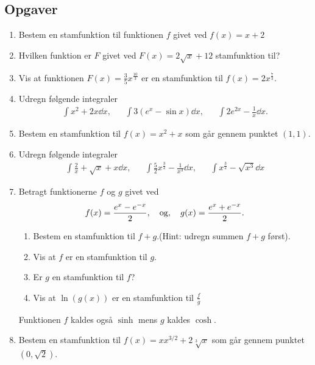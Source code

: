 \subsection{Opgaver}


\begin{enumerate}
	\item Bestem en stamfunktion til funktionen $f$ givet ved $f(x)=x+2$
	
	\item Hvilken funktion er $F$ givet ved $F(x)= 2\sqrt{x}+12$ stamfunktion til?
	
	\item Vis at funktionen $F(x)=\frac{3}{5}x^{\frac{10}{3}}$ er en stamfunktion til $f(x)=2x^{\frac{7}{3}}$.
	
	\item Udregn følgende integraler
	\begin{align*}
	\int x^2+2x\dd x,&& \int 3(e^x-\sin x) \dd x,&& \int 2e^{2x}-\frac{1}{x} \dd x.
	\end{align*}
	
	\item Bestem en stamfunktion til $f(x)=x^2+x$ som går gennem punktet $(1,1)$. 
	
	\item Udregn følgende integraler
	\begin{align*}
	\int \frac{2}{x}+\sqrt{x}+x \dd x,&& \int \frac{5}{2} x^{\frac{3}{2}}-\frac{1}{x^3} \dd x,&& \int x^{\frac{3}{2}}-\sqrt{x^3}\dd x
	\end{align*}
	
	\item\label{it:int11} Betragt funktionerne $f$ og $g$ givet ved
	\begin{align*}
	f(x)=\frac{e^x-e^{-x}}{2},\quad \textup{og},\quad g(x)=\frac{e^x+e^{-x}}{2}.
	\end{align*}
	\begin{enumerate}
		\item Bestem en stamfunktion til $f+g$.(Hint: udregn summen  $f+g$ først).
		\item Vis at $f$ er en stamfunktion til $g$.
		\item Er $g$ en stamfunktion til $f$?
		\item Vis at $ \ln(g(x)) $ er en stamfunktion til $ \frac{f}{g} $
	\end{enumerate}
	Funktionen $f$ kaldes også $\sinh$ mens $g$ kaldes $\cosh$.

	\item Bestem en stamfunktion til $f(x)=xx^{3/2}+2\sqrt[3]{x}$ som går gennem punktet $ (0,\sqrt{2}) $. 
	

\end{enumerate}
